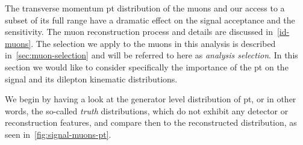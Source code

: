 The transverse momentum \gls{pt} distribution of the muons and our access to a subset of its full range have a dramatic effect on the signal acceptance and the sensitivity. The muon reconstruction process and details are discussed in~\ref{id-muons}. The selection we apply to the muons in this analysis is described in~\ref{sec:muon-selection} and will be referred to here as \emph{analysis selection}. In this section we would like to consider specifically the importance of the \gls{pt} on the signal and its dilepton kinematic distributions.

We begin by having a look at the generator level distribution of \gls{pt}, or in other words, the so-called \emph{truth} distributions, which do not exhibit any detector or reconstruction features, and compare then to the reconstructed distribution, as seen in~\ref{fig:signal-muons-pt}. 

